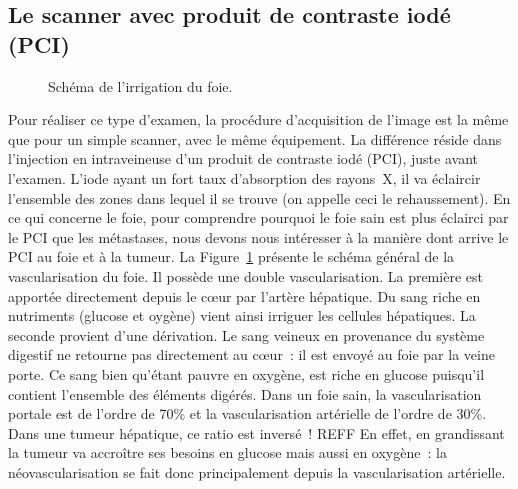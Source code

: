 \documentclass[main.tex]{subfiles}
\begin{document}
\subsection{Le scanner avec produit de contraste iodé (PCI)}
\begin{figure}[h]
\centering
\scalebox{.7}{}
\caption{\label{fig:schema_irrig_foie} Schéma de l'irrigation du foie.}
\vspace{-10mm}
\end{figure}
Pour réaliser ce type d'examen, la procédure d'acquisition de l'image est la même que pour un simple scanner, avec le même équipement. La différence réside dans l'injection en intraveineuse d'un produit de contraste iodé (PCI), juste avant l'examen. 
L'iode ayant un fort taux d'absorption des rayons~X, il va éclaircir l'ensemble des zones dans lequel il se trouve (on appelle ceci le rehaussement). 
En ce qui concerne le foie, pour comprendre pourquoi le foie sain est plus éclairci par le PCI que les métastases, nous devons nous intéresser à la manière dont arrive le PCI au foie et à la tumeur. 
La Figure~\ref{fig:schema_irrig_foie} présente le schéma général de la vascularisation du foie. 
Il possède une double vascularisation. La première est apportée directement depuis le c{\oe}ur par l'artère hépatique. Du sang riche en nutriments (glucose et oygène) vient ainsi irriguer les cellules hépatiques. La seconde provient d'une dérivation. 
Le sang veineux en provenance du système digestif ne retourne pas directement au c{\oe}ur~: il est envoyé au foie par la veine porte. Ce sang bien qu'étant pauvre en oxygène, est riche en glucose puisqu'il contient l'ensemble des éléments digérés. Dans un foie sain, la vascularisation portale est de l'ordre de 70\% et la vascularisation artérielle de l'ordre de 30\%. Dans une tumeur hépatique, ce ratio est inversé~! REFF En effet, en grandissant la tumeur va accroître ses besoins en glucose mais aussi en oxygène~: la néovascularisation se fait donc principalement depuis la vascularisation artérielle. 
\end{document}
